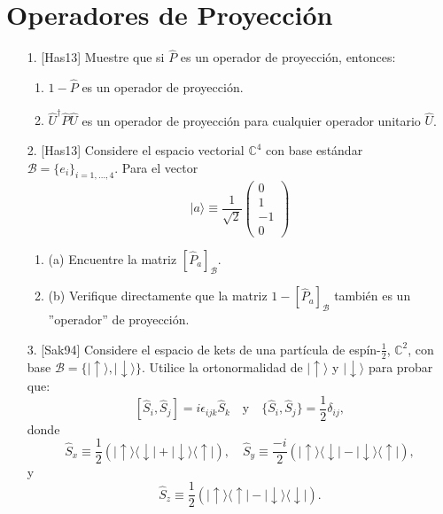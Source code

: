 \documentclass[a4paper,12pt]{article}
\begin{document}
\section*{Operadores de Proyección}

\begin{enumerate}
    \item [1.] [Has13] Muestre que si $\hat{P}$ es un operador de proyección, entonces:
    \begin{enumerate}
        \item $1 - \hat{P}$ es un operador de proyección.
        \item $\hat{U}^\dagger \hat{P} \hat{U}$ es un operador de proyección para cualquier operador unitario $\hat{U}$.
    \end{enumerate}

    \item [2.] [Has13] Considere el espacio vectorial $\mathbb{C}^4$ con base estándar $\mathcal{B} = \{e_i\}_{i=1,\ldots,4}$. Para el vector
    $$
    |a\rangle \equiv \frac{1}{\sqrt{2}} \begin{pmatrix} 0 \\ 1 \\ -1 \\ 0 \end{pmatrix}
    $$
    \begin{enumerate}
        \item (a) Encuentre la matriz $[\hat{P}_a]_{\mathcal{B}}$.
        \item (b) Verifique directamente que la matriz $1 - [\hat{P}_a]_{\mathcal{B}}$ también es un ''operador'' de proyección.
    \end{enumerate}

    \item [3.] [Sak94] Considere el espacio de kets de una partícula de espín-$\frac{1}{2}$, $\mathbb{C}^2$, con base $\mathcal{B} = \{|\uparrow\rangle, |\downarrow\rangle\}$. Utilice la ortonormalidad de $|\uparrow\rangle$ y $|\downarrow\rangle$ para probar que:
    $$
    [\hat{S}_i, \hat{S}_j] = i \epsilon_{ijk} \hat{S}_k \quad \text{y} \quad \{\hat{S}_i, \hat{S}_j\} = \frac{1}{2} \delta_{ij},
    $$
    donde
    $$
    \hat{S}_x \equiv \frac{1}{2} (|\uparrow\rangle\langle\downarrow| + |\downarrow\rangle\langle\uparrow|), \quad \hat{S}_y \equiv \frac{-i}{2} (|\uparrow\rangle\langle\downarrow| - |\downarrow\rangle\langle\uparrow|),
    $$
    y
    $$
    \hat{S}_z \equiv \frac{1}{2} (|\uparrow\rangle\langle\uparrow| - |\downarrow\rangle\langle\downarrow|).
    $$


\end{enumerate}
\end{document}

